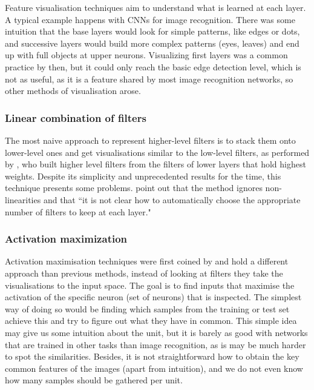 Feature visualisation techniques aim to understand what is learned at each layer. A typical example happens with CNNs for image recognition. There was some intuition that the base layers would look for simple patterns, like edges or dots, and successive layers would build more complex patterns (eyes, leaves) and end up with full objects at upper neurons. Visualizing first layers was a common practice by then, but it could only reach the basic edge detection level, which is not as useful, as it is a feature shared by most image recognition networks, so other methods of visualisation arose.

\subsubsection*{Linear combination of filters}
The most naive approach to represent higher-level filters is to stack them onto lower-level ones and get visualisations similar to the low-level filters, as performed by \cite{Lee2009}, who built higher level filters from the filters of lower layers that hold highest weights. Despite its simplicity and unprecedented results for the time, this technique presents some problems. \cite{Erhan2009} point out that the method ignores non-linearities and that ``it is not clear how to automatically choose the appropriate number of filters to keep at each layer."

\subsubsection*{Activation maximization}
Activation maximisation techniques were first coined by \cite{Erhan2009} and hold a different approach than previous methods, instead of looking at filters they take the visualisations to the input space. The goal is to find inputs that maximise the activation of the specific neuron (set of neurons) that is inspected. The simplest way of doing so would be finding which samples from the training or test set achieve this and try to figure out what they have in common. This simple idea may give us some intuition about the unit, but it is barely as good with networks that are trained in other tasks than image recognition, as is may be much harder to spot the similarities. Besides, it is not straightforward how to obtain the key common features of the images (apart from intuition), and we do not even know how many samples should be gathered per unit.

